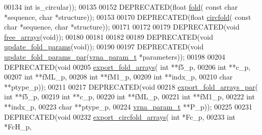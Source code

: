\begin{DoxyCode}
00134           \textcolor{keywordtype}{int} is\_circular));
00135 
00152 DEPRECATED(\textcolor{keywordtype}{float} \hyperlink{group__mfe__fold__single_gaadafcb0f140795ae62e5ca027e335a9b}{fold}( \textcolor{keyword}{const} \textcolor{keywordtype}{char} *sequence, \textcolor{keywordtype}{char} *structure));
00153 
00170 DEPRECATED(\textcolor{keywordtype}{float} \hyperlink{group__mfe__fold__single_ga4ac63ab3e8d9a80ced28b8052d94e423}{circfold}( \textcolor{keyword}{const} \textcolor{keywordtype}{char} *sequence, \textcolor{keywordtype}{char} *structure));
00171 
00172 
00179 DEPRECATED(\textcolor{keywordtype}{void} \hyperlink{group__mfe__fold__single_ga107fdfe5fd641868156bfd849f6866c7}{free\_arrays}(\textcolor{keywordtype}{void}));
00180 
00181 
00182 
00189 DEPRECATED(\textcolor{keywordtype}{void} \hyperlink{group__mfe__fold__single_ga41bf8f6fa15b94471f7095cad9f0ccf3}{update\_fold\_params}(\textcolor{keywordtype}{void}));
00190 
00197 DEPRECATED(\textcolor{keywordtype}{void} \hyperlink{group__mfe__fold__single_gae66dc422efb8f5d56717d92d6002a9f8}{update\_fold\_params\_par}(\hyperlink{group__energy__parameters_structvrna__param__s}{vrna\_param\_t} *parameters));
00198 
00204 DEPRECATED(\textcolor{keywordtype}{void}
00205 \hyperlink{group__mfe__fold__single_ga99641b8dbb40891da5490d3cc271e607}{export\_fold\_arrays}( \textcolor{keywordtype}{int} **f5\_p,
00206                     \textcolor{keywordtype}{int} **c\_p,
00207                     \textcolor{keywordtype}{int} **fML\_p,
00208                     \textcolor{keywordtype}{int} **fM1\_p,
00209                     \textcolor{keywordtype}{int} **indx\_p,
00210                     \textcolor{keywordtype}{char} **ptype\_p));
00211 
00217 DEPRECATED(\textcolor{keywordtype}{void}
00218 \hyperlink{group__mfe__fold__single_ga6606ec0ec964ea506fdadb997a1a5328}{export\_fold\_arrays\_par}( \textcolor{keywordtype}{int} **f5\_p,
00219                         \textcolor{keywordtype}{int} **c\_p,
00220                         \textcolor{keywordtype}{int} **fML\_p,
00221                         \textcolor{keywordtype}{int} **fM1\_p,
00222                         \textcolor{keywordtype}{int} **indx\_p,
00223                         \textcolor{keywordtype}{char} **ptype\_p,
00224                         \hyperlink{group__energy__parameters_structvrna__param__s}{vrna\_param\_t} **P\_p));
00225 
00231 DEPRECATED(\textcolor{keywordtype}{void}
00232 \hyperlink{group__mfe__fold__single_ga04d5d639fd4473ca766436a9bae5665c}{export\_circfold\_arrays}( \textcolor{keywordtype}{int} *Fc\_p,
00233                         \textcolor{keywordtype}{int} *FcH\_p,

\end{DoxyCode}
